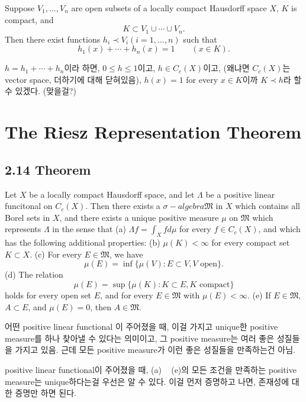 \documentclass[11pt,reqno]{amsart}
\renewcommand{\(}{\left(}
\renewcommand{\)}{\right)}
\renewcommand{\[}{\left[}
\renewcommand{\]}{\right]}
\newcommand{\M}{\mathfrak{M}}
\begin{document}
Suppose $V_1, \dots, V_n$ are open subsets of a locally compact Hausdorff space $X$, $K$ is compact, and
\begin{equation}
  K \subset V_1 \cup \cdots \cup V_n.
\end{equation}
Then there exist functions $h_i \prec V_i (i = 1, \dots, n)$ such that 
\begin{equation}
  h_1 (x) + \cdots + h_n (x) = 1 \qquad (x \in K).
\end{equation}

$h = h_1 + \cdots + h_n$이라 하면, $0 \le h \le 1$이고, $h \in C_c(X)$이고, (왜냐면 $C_c(X)$는 vector space, 더하기에 대해 닫혀있음), $h(x) = 1$ for every 
$x \in K$이까 $K \prec h$라 할 수 있겠다. (맞을걸?)

\section{The Riesz Representation Theorem}

\subsection{2.14 Theorem}

Let $X$ be a locally compact Hausdorff space, and let $\Lambda$ be a positive linear funcitonal on $C_c (X)$. Then there exists a $\sigma-algebra \M$
in $X$ which contains all Borel sets in $X$, and there exists a unique positive measure $\mu$ on $\M$ which represents $\Lambda$ in the sense that
(a) $\Lambda f = \int_X f d \mu$ for every $f \in C_c(X)$, and which has the following additional properties:
(b) $\mu (K) < \infty$ for every compact set $K \subset X$.
(c) For every $E \in \M$, we have \begin{equation}
  \mu(E) = \inf \{ \mu (V): E \subset V, V \text{ open} \}.
\end{equation}
(d) The relation \begin{equation}
  \mu(E) = \sup \{ \mu (K) : K \subset E, K \text{ compact} \}
\end{equation}
holds for every open set $E$, and for every $E \in \M$ with $\mu (E) < \infty$.
(e) If $E \in \M$, $A \subset E$, and $\mu(E) = 0$, then $A \in \M$.

어떤 positive linear functional 이 주어졌을 때, 이걸 가지고 unique한 positive measure를 하나 찾아낼 수 있다는 의미이고, 그 positive measure는 여러 좋은 성질들을 
가지고 있음. 근데 모든 positive measure가 이런 좋은 성질들을 만족하는건 아님.

positive linear functional이 주어졌을 때, (a) ~ (e)의 모든 조건을 만족하는 positive measure는 unique하다는걸 우선은 알 수 있다. 
이걸 먼저 증명하고 나면, 존재성에 대한 증명만 하면 된다.
\end{document}
